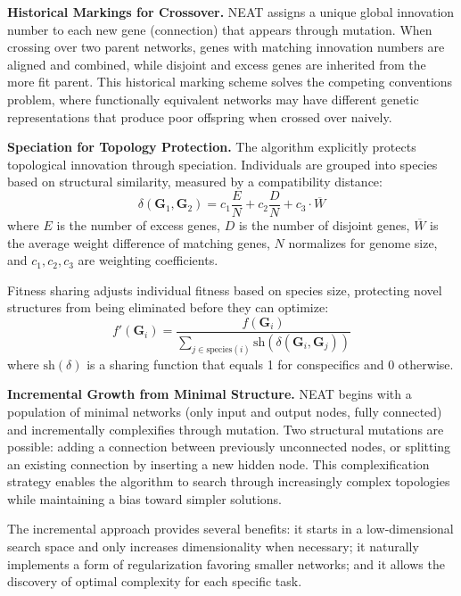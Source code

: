 \textbf{Historical Markings for Crossover.} NEAT assigns a unique global innovation number to each new gene (connection) that appears through mutation. When crossing over two parent networks, genes with matching innovation numbers are aligned and combined, while disjoint and excess genes are inherited from the more fit parent. This historical marking scheme solves the competing conventions problem, where functionally equivalent networks may have different genetic representations that produce poor offspring when crossed over naively.

\textbf{Speciation for Topology Protection.} The algorithm explicitly protects topological innovation through speciation. Individuals are grouped into species based on structural similarity, measured by a compatibility distance:
\begin{equation}
\delta(\mathbf{G}_1, \mathbf{G}_2) = c_1 \frac{E}{N} + c_2 \frac{D}{N} + c_3 \cdot \overline{W}
\end{equation}
where $E$ is the number of excess genes, $D$ is the number of disjoint genes, $\overline{W}$ is the average weight difference of matching genes, $N$ normalizes for genome size, and $c_1, c_2, c_3$ are weighting coefficients.

Fitness sharing adjusts individual fitness based on species size, protecting novel structures from being eliminated before they can optimize:
\begin{equation}
f'(\mathbf{G}_i) = \frac{f(\mathbf{G}_i)}{\sum_{j \in \text{species}(i)} \text{sh}(\delta(\mathbf{G}_i, \mathbf{G}_j))}
\end{equation}
where $\text{sh}(\delta)$ is a sharing function that equals 1 for conspecifics and 0 otherwise.

\textbf{Incremental Growth from Minimal Structure.} NEAT begins with a population of minimal networks (only input and output nodes, fully connected) and incrementally complexifies through mutation. Two structural mutations are possible: adding a connection between previously unconnected nodes, or splitting an existing connection by inserting a new hidden node. This complexification strategy enables the algorithm to search through increasingly complex topologies while maintaining a bias toward simpler solutions.

The incremental approach provides several benefits: it starts in a low-dimensional search space and only increases dimensionality when necessary; it naturally implements a form of regularization favoring smaller networks; and it allows the discovery of optimal complexity for each specific task.

